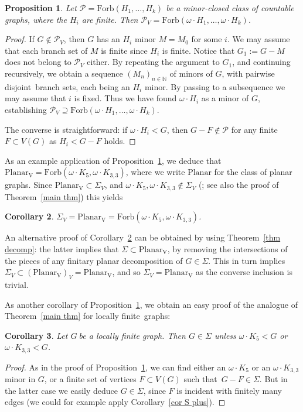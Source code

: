 \documentclass{article}
\newcommand{\forb}[1]{\mathrm{Forb}(#1)}
\newcommand{\plV}{\ensuremath{\mathrm{Planar_V}}}
\newcommand{\Sig}{\ensuremath{\Sigma}}
\newcommand{\omdot}{\omega \cdot}
\newcommand{\defi}[1]{{\color{darkgray}\emph{#1}}}
\newtheorem{proposition}{Proposition}[section]
\newtheorem{corollary}[proposition]{Corollary}
\newcommand{\N}{\ensuremath{\mathbb N}}
\newcommand{\cp}{\ensuremath{\mathcal P}}
\newcommand{\seq}[1]{\ensuremath{(#1_n)_{n\in\N}}}
\newcommand{\g}{\ensuremath{G\ }}
\newcommand{\G}{\ensuremath{G}}
\newcommand{\Ktt}{\ensuremath{K_{3,3}}}
\newcommand{\Tr}[1]{Theorem~\ref{#1}}
\newcommand{\Prr}[1]{Pro\-position~\ref{#1}}
\newcommand{\Cr}[1]{Corollary~\ref{#1}}
\newcommand{\lf}{locally finite}
\newcommand{\st}{such that}
\newcommand{\pwd}{pairwise disjoint}
\begin{document}
\begin{proposition} \label{prop PV}
Let $\cp= \forb{H_1, \ldots, H_k}$ be a minor-closed class of countable graphs, where the $H_i$ are finite. Then $\cp_V= \forb{\omdot H_1, \ldots, \omdot H_k}$.
\end{proposition}
\begin{proof}
If $G \not\in \cp_V$, then $G$ has an $H_i$ minor $M=M_0$ for some $i$. We may assume that each branch set of $M$ is finite since $H_i$ is finite. Notice that $G_1:= G - M$ does not belong to $\cp_V$ either. By repeating the argument to $G_1$, and continuing recursively, we obtain a sequence \seq{M} of minors of \G, with \pwd\  branch sets, each being an  $H_i$ minor. By passing to a subsequence we may assume that $i$ is fixed. Thus we have found $\omdot H_i$ as a minor of \G, establishing $\cp_V \supseteq \forb{\omdot H_1, \ldots, \omdot H_k}$.

The converse is straightforward: if $\omdot H_i<G$, then $G- F \not\in \cp$ for any finite $F\subset V(G)$ as $H_i< G-F$ holds.
\end{proof}

As an example application of \Prr{prop PV}, we deduce that $\plV=\forb{\omdot K_5, \omdot \Ktt}$, where we write \defi{$\mathrm{Planar}$} for the class of planar graphs. Since $\plV \subset \Sig_V$, and  $\omdot K_5, \omdot \Ktt \not\in \Sig_V$ (\cite{BHKY}; see also the proof of \Tr{main thm}) this yields

\begin{corollary} \label{cor sigV}
$\Sig_V=\plV=\forb{\omdot K_5, \omdot \Ktt}$.
\end{corollary}
An alternative proof of \Cr{cor sigV} can be obtained by using \Tr{thm decomp}: the latter implies that $\Sig \subset \plV$, by removing the intersections of the pieces of any finitary planar decomposition of $G\in \Sig$. This in turn implies $\Sig_V \subset (\plV)_V = \plV$, and so  $\Sig_V=\plV$ as the converse inclusion is trivial.


\medskip
As another corollary of \Prr{prop PV}, we obtain an easy proof of the analogue of \Tr{main thm} for \lf\ graphs:
\begin{corollary} \label{cor lf}
Let \g be a locally finite graph. Then $G\in \Sig$ unless 
$\omdot K_5 < G$ or $\omdot \Ktt<G$.
\end{corollary}
\begin{proof}
As in the proof of \Prr{prop PV}, we can find either an $\omdot K_5$ or an $\omdot \Ktt$ minor in \G, or a finite set of vertices $F\subset V(G)$ \st\ $G-F\in \Sig$. But in the latter case we easily deduce $G\in \Sig$, since $F$ is incident with finitely many edges (we could for example apply \Cr{cor S plus}).
\end{proof}
\end{document}
